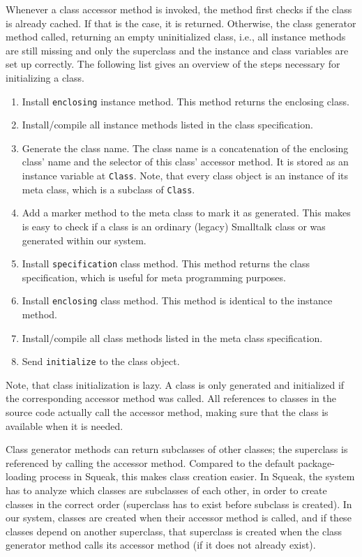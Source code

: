 Whenever a class accessor method is invoked, the method first checks if the class is already cached. If that is the case, it is returned. Otherwise, the class generator method called, returning an empty uninitialized class, i.e., all instance methods are still missing and only the superclass and the instance and class variables are set up correctly. The following list gives an overview of the steps necessary for initializing a class.

\begin{enumerate}
	\item Install \texttt{enclosing} instance method. This method returns the enclosing class.
	\item Install/compile all instance methods listed in the class specification.
	\item Generate the class name. The class name is a concatenation of the enclosing class' name and the selector of this class' accessor method. It is stored as an instance variable at \texttt{Class}. Note, that every class object is an instance of its meta class, which is a subclass of \texttt{Class}.
	\item Add a marker method to the meta class to mark it as generated. This makes is easy to check if a class is an ordinary (legacy) Smalltalk class or was generated within our system.
	\item Install \texttt{specification} class method. This method returns the class specification, which is useful for meta programming purposes.
	\item Install \texttt{enclosing} class method. This method is identical to the instance method.
	\item Install/compile all class methods listed in the meta class specification.
	\item Send \texttt{initialize} to the class object.
\end{enumerate}

Note, that class initialization is lazy. A class is only generated and initialized if the corresponding accessor method was called. All references to classes in the source code actually call the accessor method, making sure that the class is available when it is needed. 

Class generator methods can return subclasses of other classes; the superclass is referenced by calling the accessor method. Compared to the default package-loading process in Squeak, this makes class creation easier. In Squeak, the system has to analyze which classes are subclasses of each other, in order to create classes in the correct order (superclass has to exist before subclass is created). In our system, classes are created when their accessor method is called, and if these classes depend on another superclass, that superclass is created when the class generator method calls its accessor method (if it does not already exist).

